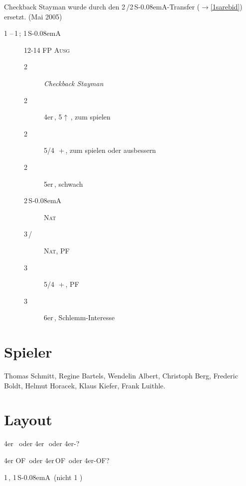 \documentclass[11pt,german,twocolumn]{scrartcl}
\renewcommand{\Cl}{{\color{ClColor}{\clubs}}}
\renewcommand{\Di}{{\color{DiColor}{\sdiamonds}}}
\renewcommand{\He}{{\color{HeColor}{\shearts}}}
\renewcommand{\Sp}{{\color{SpColor}{\spades}}}
\def\pik{\,\Sp}
\def\coe{\,\He}
\def\kar{\,\Di}
\def\tre{\,\Cl}
\def\pi{\Sp}
\def\tr{\Cl}
\def\mi{\,\Cl /\Di}
\def\ra{$\rightarrow$}
\def\pl{$\uparrow$}
\def\of{\textsf{\,OF}}
\def\ofa{\textsf{OF}}
\def\sa{\textsf{S\kern-0.08emA}}
\def\SA{\,\sa}
\def\sep{\,--\,}
\newcommand{\conv}[1]{\emph{#1}}
\def\bal{\textsc{Ausg}}
\def\nat{\textsc{Nat}}
\def\pf{\textsc{PF}}
\def\bdsc{\begin{description}}
\def\edsc{\end{description}}
\begin{document}
\begin{appendix}
Checkback Stayman wurde durch den 2\tre/2\SA-Transfer (\ra\ref{1sarebid})
ersetzt. (Mai 2005)

\bdsc
\item[1\tre\sep1\pik; 1\SA] 12-14 FP \bal
  \bdsc
  \item[2\tre] \conv{Checkback Stayman}
  \item[2\kar] 4er\pik, 5\pl{}\kar, zum spielen
  \item[2\coe] 5/4 \pik\,+\coe, zum spielen oder ausbessern
  \item[2\pik] 5er\pik, schwach
  \item[2\SA] \nat
  \item[3\mi] \nat, \pf
  \item[3\coe] 5/4 \pik\,+\coe, \pf
  \item[3\pik] 6er\pik, Schlemm-Interesse\footnotemark[1]
  \edsc
\edsc

\section{Spieler}

Thomas Schmitt,
Regine Bartels,
Wendelin Albert,
Christoph Berg,
Frederic Boldt,
Helmut Horacek,
Klaus Kiefer,
Frank Luithle.

\section{Layout}

4er \pi\ oder 4er\pik\ oder 4er-\pi?

4er \ofa\ oder 4er\of\ oder 4er-\ofa?

1\tre, 1\SA\ (nicht 1 \tr)


\end{appendix}
\end{document}
